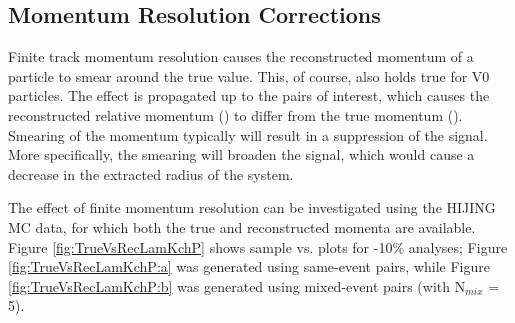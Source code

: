 \documentclass[/home/jesse/Analysis/FemtoAnalysis/AnalysisNotes/AnalysisNoteJBuxton.tex]{subfiles}
\begin{document}
\subsection{Momentum Resolution Corrections}
\label{MomentumResolutionCorrections}

Finite track momentum resolution causes the reconstructed momentum of a particle to smear around the true value.
This, of course, also holds true for V0 particles.
The effect is propagated up to the pairs of interest, which causes the reconstructed relative momentum (\krec) to differ from the true momentum (\ktrue).
Smearing of the momentum typically will result in a suppression of the signal.  More specifically, the smearing will broaden the signal, which would cause a decrease in the extracted radius of the system.

The effect of finite momentum resolution can be investigated using the HIJING MC data, for which both the true and reconstructed momenta are available.
Figure \ref{fig:TrueVsRecLamKchP} shows sample \ktrue vs. \krec plots for -10\% analyses; Figure \ref{fig:TrueVsRecLamKchP:a} was generated using same-event pairs, while Figure \ref{fig:TrueVsRecLamKchP:b} was generated using mixed-event pairs (with N$_{mix}$ = 5).  
\end{document}
